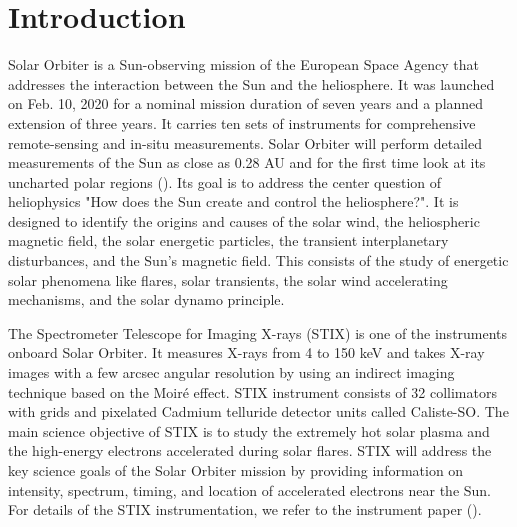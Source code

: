 \documentclass[referee]{aa} %
\begin{document}

   \maketitle
%

\section{Introduction}
Solar Orbiter is a Sun-observing mission of the European Space  Agency that 
addresses the interaction between the Sun and the heliosphere.
It was launched on Feb. 10, 2020 for a nominal mission duration of seven years and a planned 
extension of
three years. It carries ten sets of instruments for comprehensive
remote-sensing and in-situ measurements. 
Solar Orbiter  will perform detailed measurements of the Sun as close as 0.28 AU and for the first time look at its uncharted polar regions (\cite{SolarOrbiter2020}).  
Its goal is to  address the center question of heliophysics  "How does the Sun create and control the heliosphere?".  It is designed to identify the origins and causes of the solar wind, the heliospheric magnetic field, the solar energetic particles, the transient interplanetary disturbances, and the Sun's magnetic field.
This consists of the study of energetic solar phenomena like flares,  solar transients,  the solar wind accelerating mechanisms, and the solar dynamo principle.  


The Spectrometer Telescope for Imaging X-rays (STIX) is one of the instruments onboard Solar Orbiter.  
It measures X-rays from 4 to 150 keV and takes X-ray images with a few arcsec angular resolution by using an indirect imaging technique based on the Moiré effect. 
STIX instrument consists of 32 collimators with
grids and pixelated Cadmium telluride detector units called Caliste-SO.
The main science objective of STIX is to study the extremely hot solar plasma and the high-energy electrons accelerated during solar flares. STIX will address the key science goals of the Solar Orbiter mission by providing information on intensity, 
spectrum, timing, and location of accelerated electrons near the Sun.
For details of the STIX instrumentation, we refer to the instrument paper (\cite{StixInstrument}).
\end{document}
